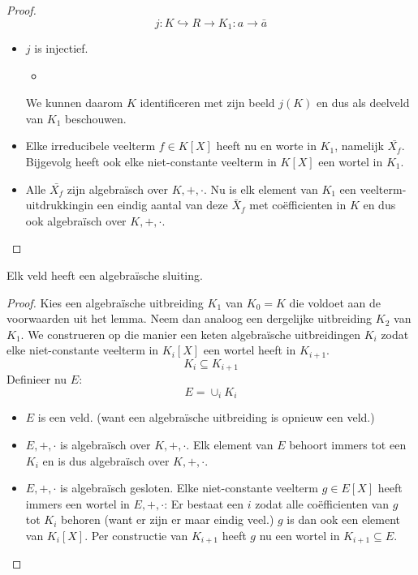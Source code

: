 \documentclass[main.tex]{subfiles}
\begin{document}
\begin{lem}
\begin{proof}
    \[ j: K \hookrightarrow R \rightarrow K_{1}: a \rightarrow \bar{a} \]
    \begin{itemize}
    \item $j$ is injectief.
      \begin{itemize}
      \item 
      \end{itemize}
      We kunnen daarom $K$ identificeren met zijn beeld $j(K)$ en dus als deelveld van $K_{1}$ beschouwen.
    \item Elke irreducibele veelterm $f\in K[X]$ heeft nu en worte in $K_{1}$, namelijk $\bar{X_{f}}$.
      Bijgevolg heeft ook elke niet-constante veelterm in $K[X]$ een wortel in $K_{1}$.\waarom
    \item Alle $\bar{X_{f}}$ zijn algebra\"isch over $K,+,\cdot$.
      Nu is elk element van $K_{1}$ een veelterm-uitdrukkingin een eindig aantal van deze $\bar{X}_{f}$ met co\"efficienten in $K$ en dus ook algebra\"isch over $K,+,\cdot$.
    \end{itemize}
  \end{proof}
\end{lem}

\begin{st}
  \examen
  Elk veld heeft een algebra\"ische sluiting.
  \begin{proof}
    Kies een algebra\"ische uitbreiding $K_{1}$ van $K_{0}=K$ die voldoet aan de voorwaarden uit het lemma.
    Neem dan analoog een dergelijke uitbreiding $K_{2}$ van $K_{1}$.
    We construeren op die manier een keten algebra\"ische uitbreidingen $K_{i}$ zodat elke niet-constante veelterm in $K_{i}[X]$ een wortel heeft in $K_{i+1}$.
    \[ K_{i} \subseteq K_{i+1} \]
    Definieer nu $E$:
    \[ E = \cup_{i}K_{i} \]
    \begin{itemize}
    \item $E$ is een veld. (want een algebra\"ische uitbreiding is opnieuw een veld.)
    \item $E,+,\cdot$ is algebra\"isch over $K,+,\cdot$.
      Elk element van $E$ behoort immers tot een $K_{i}$ en is dus algebra\"isch over $K,+,\cdot$.
    \item $E,+,\cdot$ is algebra\"isch gesloten.
      Elke niet-constante veelterm $g\in E[X]$ heeft immers een wortel in $E,+,\cdot$:
      Er bestaat een $i$ zodat alle co\"efficienten van $g$ tot $K_{i}$ behoren (want er zijn er maar eindig veel.)
      $g$ is dan ook een element van $K_{i}[X]$.
      Per constructie van $K_{i+1}$ heeft $g$ nu een wortel in $K_{i+1} \subseteq E$.
    \end{itemize}
  \end{proof}
\end{st}
\end{document}
